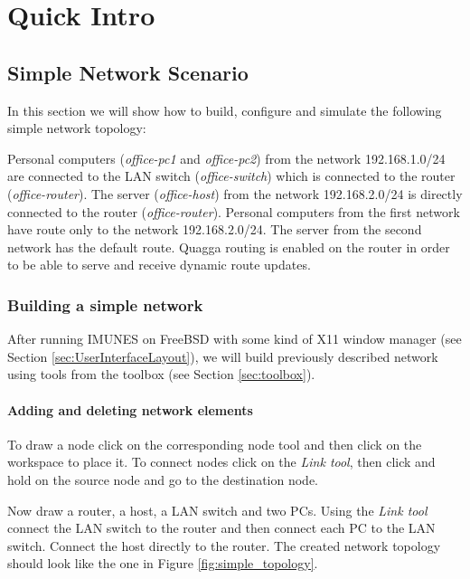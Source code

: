 \chapter{Quick Intro}

\section{Simple Network Scenario}
\label{sec:SimpleNetworkScenario}
In this section we will show how to build, configure and simulate the following
simple network topology:

Personal computers (\emph{office-pc1} and \emph{office-pc2}) from the network
192.168.1.0/24 are connected to the LAN switch (\emph{office-switch}) which is
connected to the router (\emph{office-router}). The server (\emph{office-host})
from the network 192.168.2.0/24 is directly connected to the router
(\emph{office-router}). Personal computers from the first network have route
only to the network 192.168.2.0/24. The server from the second network has the
default route. Quagga routing is enabled on the router in order to be able to
serve and receive dynamic route updates.

\subsection{Building a simple network}
After running IMUNES on FreeBSD with some kind of X11 window manager (see
Section \ref{sec:UserInterfaceLayout}), we will build previously described
network using tools from the toolbox (see Section \ref{sec:toolbox}).

\subsubsection{Adding and deleting network elements}
To draw a node click on the corresponding node tool and then click on the
workspace to place it. To connect nodes click on the \emph{Link tool}, then
click and hold on the source node and go to the destination node.

Now draw a router, a host, a LAN switch and two PCs. Using the \emph{Link tool}
connect the LAN switch to the router and then connect each PC to the LAN
switch. Connect the host directly to the router. The created network topology
should look like the one in Figure \ref{fig:simple_topology}.

